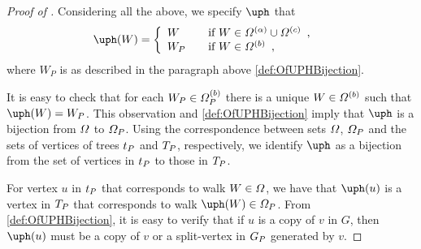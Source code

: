 \documentclass[11pt,reqno]{amsart}
\numberwithin{equation}{section}
\newcommand{\blue}[1]{{\color{blue}#1}}
\newcommand{\electricviolet}[1]{{\color{electricviolet}#1}}
\newcommand{\goldenbrown}[1]{{\color{goldenbrown}#1}}
\newcommand{\red}[1]{{\color{red}#1}}
\renewcommand{\blue}[1]{#1}
\renewcommand{\electricviolet}[1]{#1}
\renewcommand{\goldenbrown}[1]{#1}
\renewcommand{\red}[1]{#1}
\newcommand{\kP}{\goldenbrown{P}}
\newcommand{\ku}{\red{u}}
\newcommand{\kv}{\electricviolet{v}}
\newcommand{\kW}{\blue{W}}
\renewcommand{\kP}{P}
\renewcommand{\ku}{u}
\renewcommand{\kv}{v}
\renewcommand{\kW}{W}
\begin{document}
\begin{proof}[Proof of ]
Considering all the above, we specify $\ABijection$ that
% 
 \begin{align}\label{def:OfUPHBijection}
\ABijection(\kW) &= \left\{
 \begin{array}{lcl}
 \kW && \textrm{if } \kW\in \sawpaths^{(\alpha)}\cup \sawpaths^{(c)}\enspace, \\
 \kW_{\kP} && \textrm{if } \kW \in \sawpaths^{(b)} \enspace, \\
 \end{array}
 \right .
 \end{align}
where $\kW_{\kP}$ is as described in the  paragraph above \eqref{def:OfUPHBijection}. 



It is easy to check that  for each $\kW_{\kP}\in \sawpaths^{(b)}_{\kP}$ there is a unique $\kW \in \sawpaths^{(b)}$
such that  $\ABijection(\kW)=\kW_{\kP}$.  This observation and \eqref{def:OfUPHBijection} imply 
that  $\ABijection$ is a bijection from $\Omega$ to $\sawpaths_{\kP}$. Using the correspondence 
between sets $\Omega$, $\sawpaths_{\kP}$ and the sets of vertices of trees  $\STw_{\kP}$ and $\XTPw$, 
respectively, we identify $\ABijection$  as a bijection from the set of vertices in $\STw_{\kP}$ 
to those in $\XTPw$. 


For vertex $\ku$ in $\STw_{\kP}$ that corresponds to walk $\kW\in \sawpaths$,   we  have that  $\ABijection(\ku)$ is 
a vertex in   $\XTPw$ that  corresponds to  walk  $\ABijection(\kW)\in \sawpaths_{\kP}$. From \eqref{def:OfUPHBijection}, 
it is easy to verify that if $\ku$ is a copy of $\kv$ in $G$,  then $\ABijection(\ku)$ must be a copy of $\kv$ or a split-vertex in 
$\gext{G}{\kP}$ generated by $\kv$. 




\end{proof}
\end{document}
